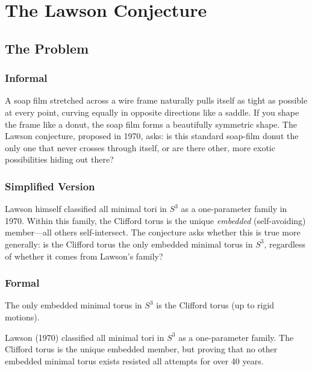 \let\LocalMacro\relax

\chapter{The Lawson Conjecture}

\section{The Problem}

\subsection{Informal}
A soap film stretched across a wire frame naturally pulls itself as tight as possible at every point, curving equally in opposite directions like a saddle. If you shape the frame like a donut, the soap film forms a beautifully symmetric shape. The Lawson conjecture, proposed in 1970, asks: is this standard soap-film donut the only one that never crosses through itself, or are there other, more exotic possibilities hiding out there?

\subsection{Simplified Version}
Lawson himself classified all minimal tori in $S^3$ as a one-parameter family in 1970. Within this family, the Clifford torus is the unique \emph{embedded} (self-avoiding) member---all others self-intersect. The conjecture asks whether this is true more generally: is the Clifford torus the only embedded minimal torus in $S^3$, regardless of whether it comes from Lawson's family?

\subsection{Formal}
\begin{conjecture}[Lawson, 1970]
The only embedded minimal torus in $S^3$ is the Clifford torus (up to rigid motions).
\end{conjecture}

\begin{historicalbox}
Lawson (1970) classified all minimal tori in $S^3$ as a one-parameter family. The Clifford torus is the unique embedded member, but proving that no other embedded minimal torus exists resisted all attempts for over 40 years.
\end{historicalbox}


